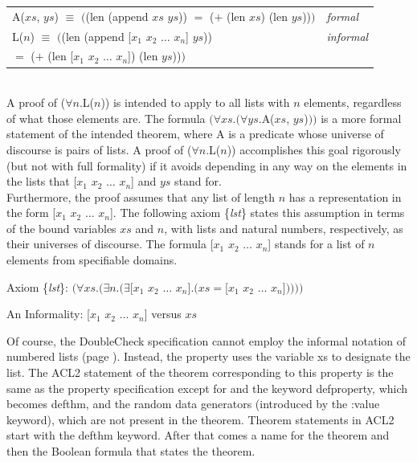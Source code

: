 \begin{aside}
\begin{center}
\begin{tabular}{ll}
A($xs$, $ys$) $\equiv$ $($\textsf{(len (append $xs$ $ys$))} $=$
\textsf{($+$ (len $xs$) (len $ys$))}$)$ & \emph{formal} \\
L($n$) $\equiv$ $($\textsf{(len (append [$x_1$ $x_2$ $\dots$ $x_n$] $ys$))} & \emph{informal}\\
\phantom{L($n$) $\equiv$ $($~~~~} $=$ \textsf{($+$ (len [$x_1$ $x_2$ $\dots$ $x_n$]) (len $ys$))}$)$ \\
\end{tabular}
\end{center}
~\\
A proof of ($\forall$$n$.L($n$))
is intended to apply to all lists with $n$ elements,
regardless of what those elements are.
The formula $(\forall xs.(\forall ys.$A($xs$, $ys$)$))$
is a more formal statement of the intended theorem,
where A is a predicate whose universe of discourse
is pairs of lists.
A proof of ($\forall$$n$.L($n$)) accomplishes this goal
rigorously (but not with full formality)
if it avoids depending in any way on the elements in the lists that
\textsf{[$x_1$ $x_2$ $\dots$ $x_n$]} and $ys$ stand for.
~\vspace{2mm}\\
Furthermore, the proof assumes that any list of length $n$
has a representation in the form \textsf{[$x_1$ $x_2$ $\dots$ $x_n$]}.
The following axiom \{\emph{lst}\} states this assumption in terms of
the bound variables $xs$ and $n$,
with lists and natural numbers, respectively, as their
universes of discourse. The formula
\textsf{[$x_1$ $x_2$ $\dots$ $x_n$]} stands for a list of $n$
elements from specifiable domains.
\begin{center}
  Axiom \{\emph{lst}\}: $(\forall xs.(\exists n.(\exists$\textsf{[$x_1$ $x_2$ $\dots$ $x_n$]}$.(xs =
  $\textsf{[$x_1$ $x_2$ $\dots$ $x_n$]}$))))$
\end{center}
\caption{An Informality: \textsf{[$x_1$ $x_2$ $\dots$ $x_n$]} versus $xs$}
\label{axiom:lst}
\end{aside}

Of course, the DoubleCheck specification
cannot employ the informal notation of numbered lists
(page \pageref{numbered-list-interpretation}).
Instead, the property uses the variable \textsf{xs} to designate the list.
The ACL2 statement of the theorem corresponding to this property
is the same as the property specification
except for and the keyword \textsf{defproperty},
which becomes \textsf{defthm}, and
the random data generators (introduced
by the \textsf{:value} keyword), which are not present in the theorem.
Theorem statements in ACL2 start with the
\textsf{defthm} keyword.
After that comes a name for the theorem and then the Boolean formula
that states the theorem.

